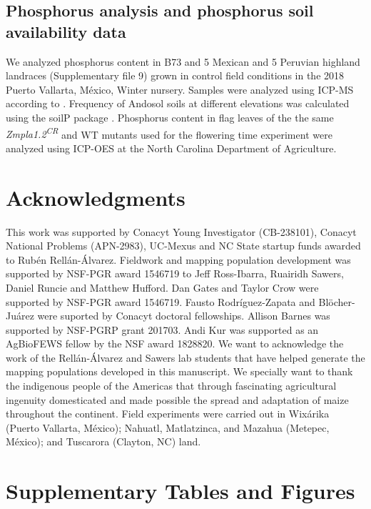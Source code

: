 \documentclass[9pt,twocolumn,twoside,lineno]{BioRxiv}
\begin{document}
\subsection{Phosphorus analysis and phosphorus soil availability data}
We analyzed phosphorus content in B73 and 5 Mexican  and 5 Peruvian highland landraces (Supplementary file 9) grown in control field conditions in the 2018 Puerto Vallarta, México, Winter nursery. 
Samples were analyzed using ICP-MS according to \cite{Baxter2014-ch}. 
Frequency of Andosol soils at different elevations was calculated using the soilP package \cite{Rodriguez-Zapata2018-vz}.
Phosphorus content in flag leaves of the the same \textit{Zmpla1.2\textsuperscript{CR}} and WT mutants used for the flowering time experiment were analyzed using ICP-OES at the North Carolina Department of Agriculture.   

\section{Acknowledgments}
This work was supported by Conacyt Young Investigator (CB-238101), Conacyt National Problems (APN-2983), UC-Mexus and NC State startup funds awarded to Rubén Rellán-Álvarez. 
Fieldwork and mapping population development was supported by NSF-PGR award 1546719 to Jeff Ross-Ibarra, Ruairidh Sawers, Daniel Runcie and Matthew Hufford.  
Dan Gates and Taylor Crow were supported by NSF-PGR award 1546719. 
Fausto Rodríguez-Zapata and Blöcher-Juárez were suported by Conacyt doctoral fellowships.
Allison Barnes was supported by NSF-PGRP grant 201703. 
Andi Kur was supported as an AgBioFEWS fellow by the NSF award 1828820.
We want to acknowledge the work of the Rellán-Álvarez and Sawers lab students that have helped generate the mapping populations developed in this manuscript.
We specially want to thank the indigenous people of the Americas that through fascinating agricultural ingenuity domesticated and made possible the spread and adaptation of maize throughout the continent. 
Field experiments were carried out in Wixárika (Puerto Vallarta, México); Nahuatl, Matlatzinca, and Mazahua (Metepec, México); and Tuscarora (Clayton, NC) land.
\label{sec:acknowledgments}



\clearpage

\onecolumn

\section*{Supplementary Tables and Figures}
\end{document}
